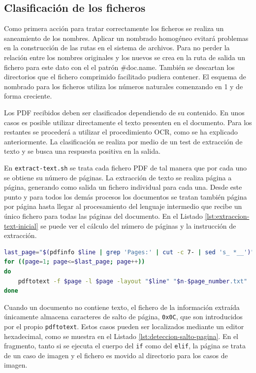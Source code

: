 
\subsection{Clasificación de los ficheros}

Como primera acción para tratar correctamente los ficheros se realiza un saneamiento de los nombres. Aplicar un nombrado homogéneo evitará problemas en la construcción de las rutas en el sistema de archivos. Para no perder la relación entre los nombres originales y los nuevos se crea en la ruta de salida un fichero para este dato con el el patrón \#doc.name. También se descartan los directorios que el fichero comprimido facilitado pudiera contener. El esquema de nombrado para los ficheros utiliza los números naturales comenzando en 1 y de forma creciente.

Los PDF recibidos deben ser clasificados dependiendo de su contenido. En unos casos es posible utilizar directamente el texto presenten en el documento. Para los restantes se procederá a utilizar el procedimiento OCR, como se ha explicado anteriormente. La clasificación se realiza por medio de un test de extracción de texto y se busca una respuesta positiva en la salida.

En \verb|extract-text.sh| se trata cada fichero PDF de tal manera que por cada uno se obtiene su número de páginas. La extracción de texto se realiza página a página, generando como salida un fichero individual para cada una. Desde este punto y para todos los demás procesos los documentos se tratan también página por página hasta llegar al procesamiento del lenguaje intermedio que recibe un único fichero para todas las páginas del documento. En el Listado \ref{lst:extraccion-text-inicial} se puede ver el cálculo del número de páginas y la instrucción de extracción.

\begin{lstlisting}[language=bash,caption={Extracción tentativa del texto.},label=lst:extraccion-text-inicial]
last_page="$(pdfinfo $line | grep 'Pages:' | cut -c 7- | sed 's_ *__')"
for ((page=1; page<=$last_page; page++))
do
    pdftotext -f $page -l $page -layout "$line" "$n-$page_number.txt"
done
\end{lstlisting}

Cuando un documento no contiene texto, el fichero de la información extraída únicamente almacena caracteres de salto de página, \verb|0x0C|, que son introducidos por el propio \verb|pdftotext|. Estos casos pueden ser localizados mediante un editor hexadecimal, como se muestra en el Listado \ref{lst:deteccion-salto-pagina}. En el fragmento, tanto si se ejecuta el cuerpo del \verb|if| como del \verb|elif|, la página se trata de un caso de imagen y el fichero es movido al directorio para los casos de imagen.

